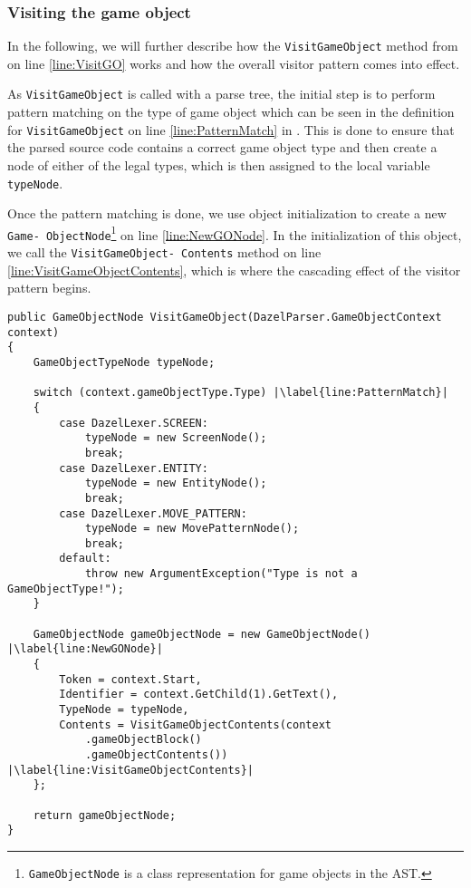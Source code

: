 \subsubsection*{Visiting the game object}
In the following, we will further describe how the \texttt{VisitGameObject} method from  on line \ref{line:VisitGO} works and how the overall visitor pattern comes into effect.

As \texttt{VisitGameObject} is called with a parse tree, the initial step is to perform pattern matching on the type of game object which can be seen in the definition for \texttt{VisitGameObject} on line \ref{line:PatternMatch} in . This is done to ensure that the parsed source code contains a correct game object type and then create a node of either of the legal types, which is then assigned to the local variable \texttt{typeNode}.

Once the pattern matching is done, we use object initialization to create a new \texttt{Game-
ObjectNode}\footnote{\texttt{GameObjectNode} is a class representation for game objects in the AST.} on line \ref{line:NewGONode}. 
In the initialization of this object, we call the \texttt{VisitGameObject-
Contents} method on line \ref{line:VisitGameObjectContents}, which is where the cascading effect of the visitor pattern begins. 

\begin{lstlisting}[language=CSharp, caption={The initial stage of visiting}, label={lst:VisitParseTree},escapechar=|]
public GameObjectNode VisitGameObject(DazelParser.GameObjectContext context)
{
    GameObjectTypeNode typeNode;
    
    switch (context.gameObjectType.Type) |\label{line:PatternMatch}|
    {
        case DazelLexer.SCREEN:
            typeNode = new ScreenNode();
            break;
        case DazelLexer.ENTITY:
            typeNode = new EntityNode();
            break;
        case DazelLexer.MOVE_PATTERN:
            typeNode = new MovePatternNode();
            break;
        default:
            throw new ArgumentException("Type is not a GameObjectType!");
    }

    GameObjectNode gameObjectNode = new GameObjectNode() |\label{line:NewGONode}|
    {
        Token = context.Start,
        Identifier = context.GetChild(1).GetText(),
        TypeNode = typeNode,
        Contents = VisitGameObjectContents(context
            .gameObjectBlock()
            .gameObjectContents()) |\label{line:VisitGameObjectContents}|
    };
    
    return gameObjectNode;
}
\end{lstlisting}


